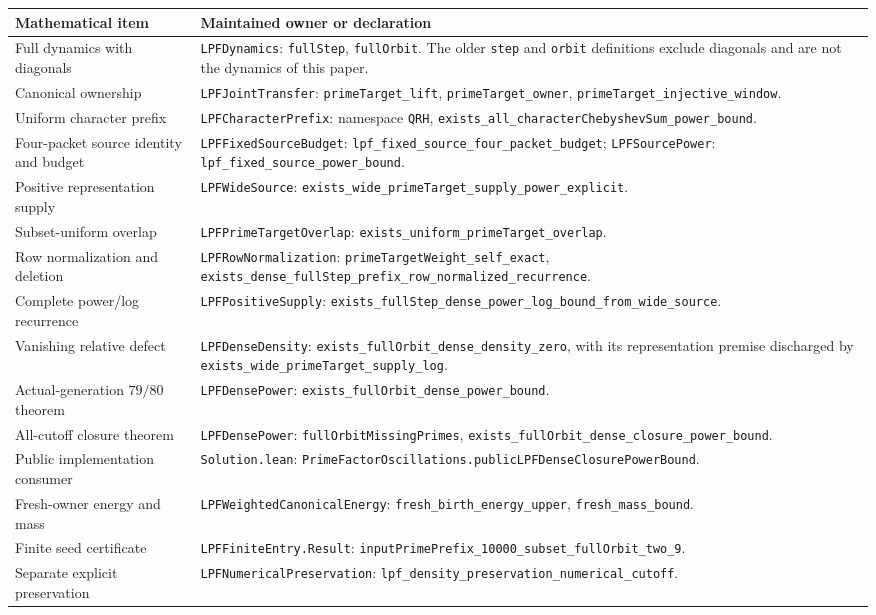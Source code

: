 \documentclass[11pt]{article}
\theoremstyle{definition}
\theoremstyle{remark}
\newcommand{\lean}[1]{\nolinkurl{#1}}
\begin{document}
\small
\begin{longtable}{@{}>{\raggedright\arraybackslash}p{}>{\raggedright\arraybackslash}p{}@{}}
\toprule
Mathematical item & Maintained owner or declaration\\
\midrule
\endhead
Full dynamics with diagonals &
\lean{LPFDynamics}: \lean{fullStep}, \lean{fullOrbit}. The older
\lean{step} and \lean{orbit} definitions exclude diagonals and are
not the dynamics of this paper.\\[3pt]
Canonical ownership &
\lean{LPFJointTransfer}: \lean{primeTarget_lift},
\lean{primeTarget_owner}, \lean{primeTarget_injective_window}.\\[3pt]
Uniform character prefix &
\lean{LPFCharacterPrefix}: namespace \lean{QRH},
\lean{exists_all_characterChebyshevSum_power_bound}.\\[3pt]
Four-packet source identity and budget &
\lean{LPFFixedSourceBudget}: \lean{lpf_fixed_source_four_packet_budget};
\lean{LPFSourcePower}: \lean{lpf_fixed_source_power_bound}.\\[3pt]
Positive representation supply &
\lean{LPFWideSource}:
\lean{exists_wide_primeTarget_supply_power_explicit}.\\[3pt]
Subset-uniform overlap &
\lean{LPFPrimeTargetOverlap}:
\lean{exists_uniform_primeTarget_overlap}.\\[3pt]
Row normalization and deletion &
\lean{LPFRowNormalization}:
\lean{primeTargetWeight_self_exact},
\lean{exists_dense_fullStep_prefix_row_normalized_recurrence}.\\[3pt]
Complete power/log recurrence &
\lean{LPFPositiveSupply}:
\lean{exists_fullStep_dense_power_log_bound_from_wide_source}.\\[3pt]
Vanishing relative defect &
\lean{LPFDenseDensity}:
\lean{exists_fullOrbit_dense_density_zero}, with its representation
premise discharged by \lean{exists_wide_primeTarget_supply_log}.\\[3pt]
Actual-generation \(79/80\) theorem &
\lean{LPFDensePower}:
\lean{exists_fullOrbit_dense_power_bound}.\\[3pt]
All-cutoff closure theorem &
\lean{LPFDensePower}:
\lean{fullOrbitMissingPrimes},
\lean{exists_fullOrbit_dense_closure_power_bound}.\\[3pt]
Public implementation consumer &
\lean{Solution.lean}:
\lean{PrimeFactorOscillations.publicLPFDenseClosurePowerBound}.\\[3pt]
Fresh-owner energy and mass &
\lean{LPFWeightedCanonicalEnergy}:
\lean{fresh_birth_energy_upper}, \lean{fresh_mass_bound}.\\[3pt]
Finite seed certificate &
\lean{LPFFiniteEntry.Result}:
\lean{inputPrimePrefix_10000_subset_fullOrbit_two_9}.\\[3pt]
Separate explicit preservation &
\lean{LPFNumericalPreservation}:
\lean{lpf_density_preservation_numerical_cutoff}.\\
\bottomrule
\end{longtable}
\normalsize
\end{document}
